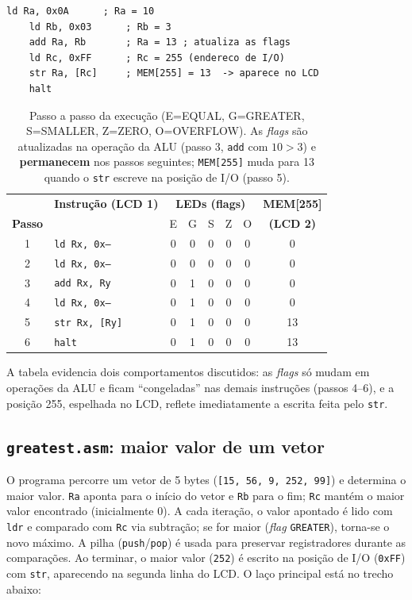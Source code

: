 \documentclass[12pt,a4paper]{article}
\begin{document}
\noindent\begin{minipage}{\linewidth}
\begin{lstlisting}[style=asm]
    ld Ra, 0x0A      ; Ra = 10
    ld Rb, 0x03      ; Rb = 3
    add Ra, Rb       ; Ra = 13 ; atualiza as flags
    ld Rc, 0xFF      ; Rc = 255 (endereco de I/O)
    str Ra, [Rc]     ; MEM[255] = 13  -> aparece no LCD
    halt
\end{lstlisting}
\end{minipage}

\begin{table}[H]
\centering
\small
\begin{tabular}{clccccc c}
\hline
 & \textbf{Instrução (LCD 1)} & \multicolumn{5}{c}{\textbf{LEDs (flags)}} & \textbf{MEM[255]} \\
\textbf{Passo} & & E & G & S & Z & O & \textbf{(LCD 2)} \\
\hline
1 & \texttt{ld Rx, 0x--}  & 0 & 0 & 0 & 0 & 0 & 0 \\
2 & \texttt{ld Rx, 0x--}  & 0 & 0 & 0 & 0 & 0 & 0 \\
3 & \texttt{add Rx, Ry}   & 0 & 1 & 0 & 0 & 0 & 0 \\
4 & \texttt{ld Rx, 0x--}  & 0 & 1 & 0 & 0 & 0 & 0 \\
5 & \texttt{str Rx, [Ry]} & 0 & 1 & 0 & 0 & 0 & 13 \\
6 & \texttt{halt}         & 0 & 1 & 0 & 0 & 0 & 13 \\
\hline
\end{tabular}
\caption{Passo a passo da execução (E=EQUAL, G=GREATER, S=SMALLER, Z=ZERO, O=OVERFLOW).
         As \textit{flags} são atualizadas na operação da ALU (passo 3, \texttt{add} com
         $10>3$) e \textbf{permanecem} nos passos seguintes; \texttt{MEM[255]} muda para 13
         quando o \texttt{str} escreve na posição de I/O (passo 5).}
\label{tab:trace}
\end{table}

A tabela evidencia dois comportamentos discutidos: as \textit{flags} só mudam em operações
da ALU e ficam ``congeladas'' nas demais instruções (passos 4--6), e a posição 255,
espelhada no LCD, reflete imediatamente a escrita feita pelo \texttt{str}.

\subsection{\texttt{greatest.asm}: maior valor de um vetor}

O programa percorre um vetor de 5 bytes (\texttt{[15, 56, 9, 252, 99]}) e determina o maior
valor. \texttt{Ra} aponta para o início do vetor e \texttt{Rb} para o fim; \texttt{Rc}
mantém o maior valor encontrado (inicialmente 0). A cada iteração, o valor apontado é lido
com \texttt{ldr} e comparado com \texttt{Rc} via subtração; se for maior
(\textit{flag} \texttt{GREATER}), torna-se o novo máximo. A pilha (\texttt{push}/\texttt{pop})
é usada para preservar registradores durante as comparações. Ao terminar, o maior valor
(\texttt{252}) é escrito na posição de I/O (\texttt{0xFF}) com \texttt{str}, aparecendo na
segunda linha do LCD. O laço principal está no trecho abaixo:
\end{document}
